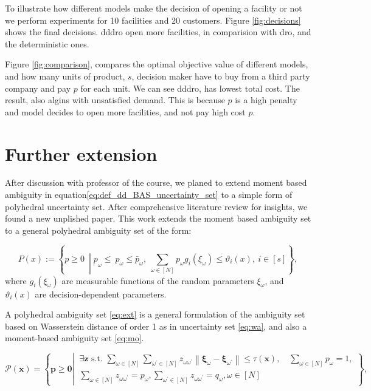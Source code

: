 \documentclass[12pt, letterpaper]{article}
\begin{document}
		To illustrate how different models make the decision of opening a facility or not we perform experiments for 10 facilities and 20 customers. Figure \ref{fig:decisions} shows the final decisions. \gls{dddro} open more facilities, in comparision with \gls{dro}, and the deterministic ones.


	Figure \ref{fig:comparison}, compares the optimal objective value of different models, and how many units of product, $s$, decision maker have to buy from a third party company and pay $p$ for each unit. We can see \gls{dddro}, has lowest total cost. The result, also algins with unsatisfied demand. This is because $p$ is a high penalty and model decides to open more facilities, and not pay high cost $p$.


\section{Further extension}

After discussion with professor of the course, we planed to extend moment based ambiguity in equation\ref{eq:def_dd_BAS_uncertainty_set} to a simple form of polyhedral uncertainty set. After comprehensive literature review for insights, we found \cite{rahimiandistributionally} a new unplished paper. This work extends the moment based ambiguity set to a general polyhedral ambiguity set of the form:

\begin{equation}\label{eq:ext}
	P(x) := \left\{ p \geq 0 \ \middle| \underbar{p}_\omega \leq \ p_\omega \leq \bar{p}_\omega, \ \sum_{\omega \in [N]} p_\omega g_i(\xi_\omega) \leq \vartheta_i(x), \ i \in [s] \right\},
	\end{equation}
	where $g_i(\xi_\omega)$ are measurable functions of the random parameters $\xi_\omega$, and $\vartheta_i(x)$ are decision-dependent parameters.

	A polyhedral ambiguity set \ref{eq:ext} is a general formulation of the ambiguity set based on Wasserstein distance of order 1 as in uncertainty set \ref{eq:wa}, and also a moment-based ambiguity set \ref{eq:mo}.

	\begin{equation}\label{eq:wa}
		\mathcal{P}(\boldsymbol{x})=\left\{\boldsymbol{p} \geq \mathbf{0} \left\lvert\, \begin{array}{l|l}
		\exists \boldsymbol{z} \text { s.t. } \sum_{\omega \in[N]} \sum_{\omega^{\prime} \in[N]} z_{\omega \omega^{\prime}}\left\|\boldsymbol{\xi}_\omega-\boldsymbol{\xi}_{\omega^{\prime}}\right\| \leq \tau(\boldsymbol{x}), \quad \sum_{\omega \in[N]} p_\omega=1, \\
		\sum_{\omega \in[N]} z_{\omega \omega^{\prime}}=p_\omega, \sum_{\omega^{\prime} \in[N]} z_{\omega \omega^{\prime}}=q_\omega, \omega \in[N]
		\end{array}\right.\right\},
		\end{equation}
\end{document}
